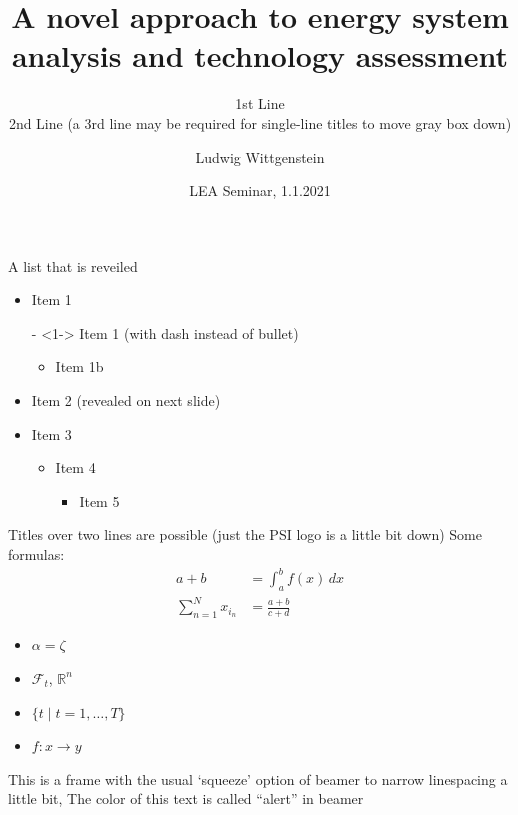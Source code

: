 \documentclass[aspectratio=43]{beamer} %
\begin{document}
\title{A novel approach to energy system analysis and technology assessment}

\author[L.~Wittgenstein]{Ludwig Wittgenstein}


\subtitle{1st Line\\2nd Line (a 3rd line may be required for single-line titles to move gray box down)}

\date{LEA Seminar, 1.1.2021} %

\begin{frame}[plain] %
  \titlepage
\end{frame}


\begin{frame}{A list that is reveiled}  
  \begin{itemize}
  \item<1-> Item 1
  \item[-]<1->  Item 1 (with dash instead of bullet)
    \begin{itemize}
    \item<1-> Item 1b
    \end{itemize}
  \item<2->  Item 2 (revealed on next slide)
  \item<3-> Item 3
    \begin{itemize}
    \item<3-> Item 4
      \begin{itemize}
      \item<3-> Item 5
      \end{itemize}
    \end{itemize}
  \end{itemize}
 \vspace*{\fill} %
\end{frame}



\begin{frame}[squeeze]{Titles over two lines are possible (just the PSI logo is a little bit down)}
  Some formulas:
  \begin{align*}
    a + b  & = \int_a^b f(x)\,dx \\
    \sum_{n=1}^N x_{i_n} &= \frac{a+b}{c+d} 
  \end{align*}
  \begin{itemize}
  \item  $\alpha = \zeta$ 
  \item $\mathcal{F}_t$, $\mathbb{R}^n$
  \item $\{t \mid t=1,\dots,T\}$
  \item $f\colon x\to y$
  \end{itemize}
   \alert{This is a frame with the usual `squeeze' option of beamer to narrow linespacing a little bit, The color of this text is called ``alert'' in beamer}
  
\end{frame}
\end{document}
